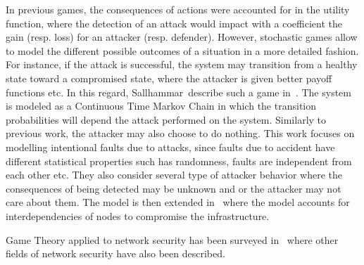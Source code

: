 In previous games, the consequences of actions were accounted for in the utility function, where the detection of an attack would impact with a coefficient the gain (resp. loss) for an attacker (resp. defender).
However, stochastic games allow to model the different possible outcomes of a situation in a more detailed fashion.
For instance, if the attack is successful, the system may transition from a healthy state toward a compromised state, where the attacker is given better payoff functions etc.
In this regard, Sallhammar~\etal describe such a game in~\cite{sallhammar2005}.
The system is modeled as a Continuous Time Markov Chain in which the transition probabilities will depend the attack performed on the system. Similarly to previous work, the attacker may also choose to do nothing.
This work focuses on modelling intentional faults due to attacks, since faults due to accident have different statistical properties such has randomness, faults are independent from each other etc.
They also consider several type of attacker behavior where the consequences of being detected may be unknown and or the attacker may not care about them.
The model is then extended in~\cite{Nguyen2009} where the model accounts for interdependencies of nodes to compromise the infrastructure.

 
 Game Theory applied to network security has been surveyed in~\cite{Roy2010,Kiennert2018} where other fields of network security have also been described. 